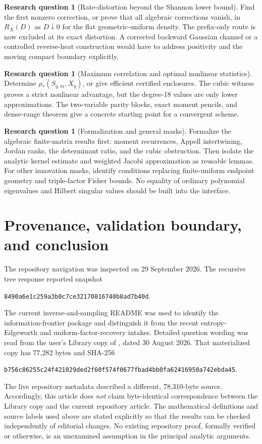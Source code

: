 \documentclass[11pt,a4paper]{article}
\numberwithin{equation}{section}
\theoremstyle{definition}\newtheorem{definition}[theorem]{Definition}
\newtheorem{problem}[theorem]{Research question}
\theoremstyle{remark}\newtheorem{remark}[theorem]{Remark}
\begin{document}
\begin{problem}[Rate-distortion beyond the Shannon lower bound]
Find the first nonzero correction, or prove that all algebraic corrections vanish, in $R_X(D)$ as $D\downarrow0$ for the flat geometric-uniform density. The prefix-only route is now excluded at its exact distortion. A corrected backward Gaussian channel or a controlled reverse-heat construction would have to address positivity and the moving compact boundary explicitly.
\end{problem}

\begin{problem}[Maximum correlation and optimal nonlinear statistics]
Determine $\rho_*(S_{q,m},X_q)$, or give efficient certified enclosures. The cubic witness proves a strict nonlinear advantage, but the degree-18 values are only lower approximations. The two-variable parity blocks, exact moment pencils, and dense-range theorem give a concrete starting point for a convergent scheme.
\end{problem}

\begin{problem}[Formalization and general masks]
Formalize the algebraic finite-matrix results first: moment recurrences, Appell intertwining, Jordan ranks, the determinant ratio, and the cubic obstruction. Then isolate the analytic kernel estimate and weighted Jacobi approximation as reusable lemmas. For other innovation masks, identify conditions replacing finite-uniform endpoint geometry and triple-factor Fisher bounds. No equality of ordinary polynomial eigenvalues and Hilbert singular values should be built into the interface.
\end{problem}

\section{Provenance, validation boundary, and conclusion}
\label{sec:provenance}
The repository navigation was inspected on 29 September 2026. The recursive tree response reported snapshot
\begin{center}\small\texttt{8490a6e1c259a3b0c7ce32170816740b8ad7b40d}.\end{center}
The current inverse-and-sampling README was used to identify the information-frontier package and distinguish it from the recent entropy-Edgeworth and uniform-factor-recovery intakes. Detailed question wording was read from the user's Library copy of , dated 30 August 2026. That materialized copy has 77,282 bytes and SHA-256
\begin{center}\scriptsize\texttt{b756c86255c24f421029ded2f60f574f0677fbad4bb0fa62416950a742ebda45}.\end{center}
The live repository metadata described a different, 78,310-byte source. Accordingly, this article does \emph{not} claim byte-identical correspondence between the Library copy and the current repository article. The mathematical definitions and source labels used above are stated explicitly so that the results can be checked independently of editorial changes. No existing repository proof, formally verified or otherwise, is an unexamined assumption in the principal analytic arguments.
\end{document}
